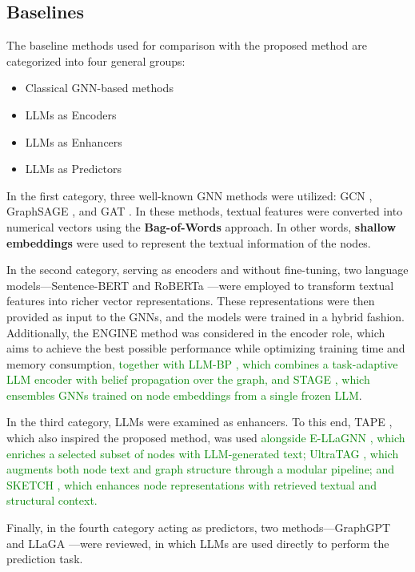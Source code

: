 \documentclass[a4paper,fleqn]{cas-sc}
\newcommand{\revthree}[1]{\textcolor{green}{#1}} %
\begin{document}
\subsection{Baselines}
The baseline methods used for comparison with the proposed method are categorized into four general groups:
\begin{itemize}
    \item Classical GNN-based methods
    \item LLMs as Encoders
    \item LLMs as Enhancers
    \item LLMs as Predictors
\end{itemize}

In the first category, three well-known GNN methods were utilized: GCN  \citep{Kipf2016GCN}, GraphSAGE  \citep{hamilton2017sage}, and GAT  \citep{Velickovic2018GAT}. In these methods, textual features were converted into numerical vectors using the \textbf{Bag-of-Words} approach. In other words, \textbf{shallow embeddings} were used to represent the textual information of the nodes.

In the second category, serving as encoders and without fine-tuning, two language models—Sentence-BERT  \citep{reimers2019sentencebert} and RoBERTa  \citep{zhuang2021robustly}—were employed to transform textual features into richer vector representations. These representations were then provided as input to the GNNs, and the models were trained in a hybrid fashion. Additionally, the ENGINE  \citep{Zhu2024EfficientTextualGraphs} method was considered in the encoder role, which aims to achieve the best possible performance while optimizing training time and memory consumption\revthree{, together with LLM-BP \citep{wang2025llmbp}, which combines a task-adaptive LLM encoder with belief propagation over the graph, and STAGE \citep{zolnai-lucas-etal-2024-stage}, which ensembles GNNs trained on node embeddings from a single frozen LLM}.

In the third category, LLMs were examined as enhancers. To this end, TAPE  \citep{he2024harnessing}, which also inspired the proposed method, was used \revthree{alongside E-LLaGNN \citep{Jaiswal2024AllAgainstSome}, which enriches a selected subset of nodes with LLM-generated text; UltraTAG \citep{yu2025ultratag}, which augments both node text and graph structure through a modular pipeline; and SKETCH \citep{zhou-etal-2025sketch}, which enhances node representations with retrieved textual and structural context.}

Finally, in the fourth category acting as predictors, two methods—GraphGPT  \citep{tang2024graphgpt} and LLaGA \citep{Chen2024LLaGA}—were reviewed, in which LLMs are used directly to perform the prediction task.
\end{document}
